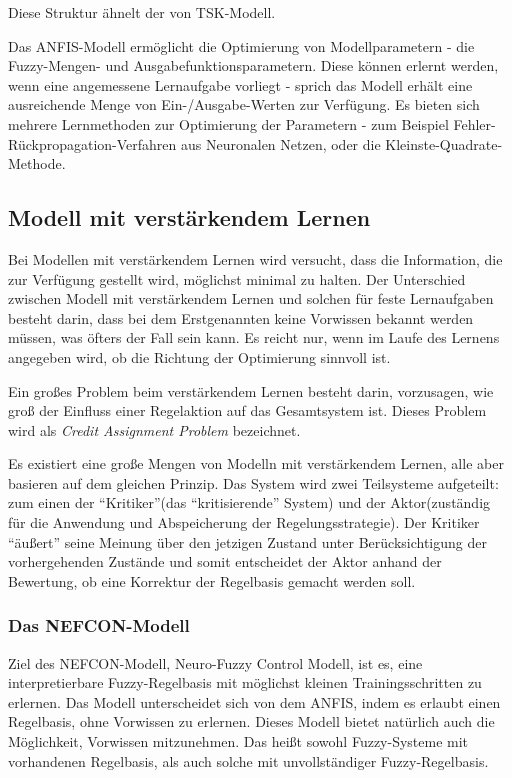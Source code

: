 Diese Struktur ähnelt der von TSK-Modell.

Das ANFIS-Modell ermöglicht die Optimierung von Modellparametern - die Fuzzy-Mengen- und Ausgabefunktionsparametern. Diese können erlernt werden, wenn eine angemessene Lernaufgabe vorliegt - sprich das Modell erhält eine ausreichende Menge von Ein-/Ausgabe-Werten zur Verfügung. Es bieten sich mehrere Lernmethoden zur Optimierung der Parametern - zum Beispiel Fehler-Rückpropagation-Verfahren aus Neuronalen Netzen, oder die Kleinste-Quadrate-Methode. \cite{CIKruse:15} \cite{Jang:93}

\subsection{Modell mit verstärkendem Lernen}

Bei Modellen mit verstärkendem Lernen wird versucht, dass die Information, die zur Verfügung gestellt wird, möglichst minimal zu halten. Der Unterschied zwischen Modell mit verstärkendem Lernen und solchen für feste Lernaufgaben besteht darin, dass bei dem Erstgenannten keine Vorwissen bekannt werden müssen, was öfters der Fall sein kann. Es reicht nur, wenn im Laufe des Lernens angegeben wird, ob die Richtung der Optimierung sinnvoll ist.

Ein großes Problem beim verstärkendem Lernen besteht darin, vorzusagen, wie groß der Einfluss einer Regelaktion auf das Gesamtsystem ist. Dieses Problem wird als \textit{Credit Assignment Problem} bezeichnet.

Es existiert eine große Mengen von Modelln mit verstärkendem Lernen, alle aber basieren auf dem gleichen Prinzip. Das System wird zwei Teilsysteme aufgeteilt: zum einen der ``Kritiker''(das ``kritisierende'' System) und der Aktor(zuständig für die Anwendung und Abspeicherung der Regelungsstrategie). Der Kritiker ``äußert'' seine Meinung über den jetzigen Zustand unter Berücksichtigung der vorhergehenden Zustände und somit entscheidet der Aktor anhand der Bewertung, ob eine Korrektur der Regelbasis gemacht werden soll. \cite{CIKruse:15}  \cite{UNIMAG:97}

\subsubsection{Das NEFCON-Modell}

Ziel des NEFCON-Modell, Neuro-Fuzzy Control Modell, ist es, eine interpretierbare Fuzzy-Regelbasis mit möglichst kleinen Trainingsschritten zu erlernen. Das Modell unterscheidet sich von dem ANFIS, indem es erlaubt einen Regelbasis, ohne Vorwissen zu erlernen. Dieses Modell bietet natürlich auch die Möglichkeit, Vorwissen mitzunehmen. Das heißt sowohl Fuzzy-Systeme mit vorhandenen Regelbasis, als auch solche mit unvollständiger Fuzzy-Regelbasis.

